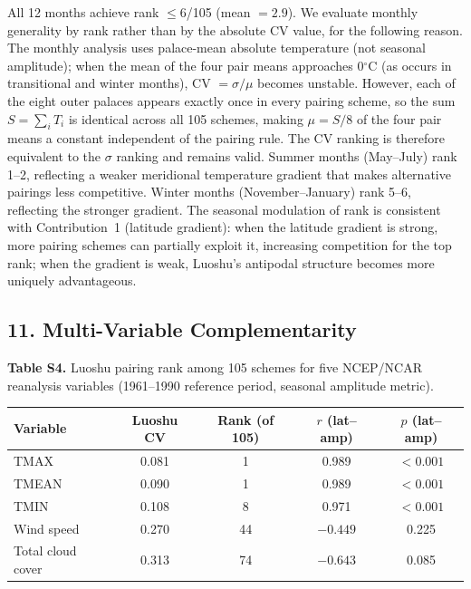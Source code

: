 \documentclass[10pt]{article}
\begin{document}
\vspace{6pt}
\noindent All 12 months achieve rank $\leq$6/105 (mean $= 2.9$). We evaluate monthly generality by rank rather than by the absolute CV value, for the following reason. The monthly analysis uses palace-mean absolute temperature (not seasonal amplitude); when the mean of the four pair means approaches 0$^\circ$C (as occurs in transitional and winter months), CV $= \sigma/\mu$ becomes unstable. However, each of the eight outer palaces appears exactly once in every pairing scheme, so the sum $S = \sum_i T_i$ is identical across all 105 schemes, making $\mu = S/8$ of the four pair means a constant independent of the pairing rule. The CV ranking is therefore equivalent to the $\sigma$ ranking and remains valid. Summer months (May--July) rank 1--2, reflecting a weaker meridional temperature gradient that makes alternative pairings less competitive. Winter months (November--January) rank 5--6, reflecting the stronger gradient. The seasonal modulation of rank is consistent with Contribution~1 (latitude gradient): when the latitude gradient is strong, more pairing schemes can partially exploit it, increasing competition for the top rank; when the gradient is weak, Luoshu's antipodal structure becomes more uniquely advantageous.

\subsection*{11. Multi-Variable Complementarity}

\textbf{Table S4.} Luoshu pairing rank among 105 schemes for five NCEP/NCAR reanalysis variables (1961--1990 reference period, seasonal amplitude metric).

\vspace{6pt}

\begin{tabular}{lcccc}
\toprule
Variable & Luoshu CV & Rank (of 105) & $r$ (lat--amp) & $p$ (lat--amp) \\
\midrule
TMAX & 0.081 & 1 & 0.989 & $<0.001$ \\
TMEAN & 0.090 & 1 & 0.989 & $<0.001$ \\
TMIN & 0.108 & 8 & 0.971 & $<0.001$ \\
Wind speed & 0.270 & 44 & $-0.449$ & 0.225 \\
Total cloud cover & 0.313 & 74 & $-0.643$ & 0.085 \\
\bottomrule
\end{tabular}
\end{document}
